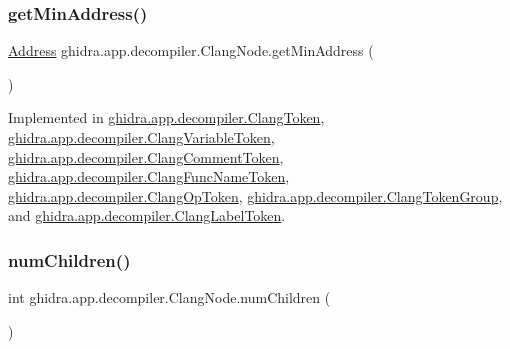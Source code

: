 \mbox{\label{interfaceghidra_1_1app_1_1decompiler_1_1_clang_node_a28f86ac40636cd77392e26367db69dc3}} 
\subsubsection{\texorpdfstring{getMinAddress()}{getMinAddress()}}
{\footnotesize\ttfamily \mbox{\hyperlink{class_address}{Address}} ghidra.\+app.\+decompiler.\+Clang\+Node.\+get\+Min\+Address (\begin{DoxyParamCaption}{ }\end{DoxyParamCaption})}



Implemented in \mbox{\hyperlink{classghidra_1_1app_1_1decompiler_1_1_clang_token_ad29a43e8aae3a2250fcb8632a4010993}{ghidra.\+app.\+decompiler.\+Clang\+Token}}, \mbox{\hyperlink{classghidra_1_1app_1_1decompiler_1_1_clang_variable_token_a655defda8c1c17f607fdddb356e51b6b}{ghidra.\+app.\+decompiler.\+Clang\+Variable\+Token}}, \mbox{\hyperlink{classghidra_1_1app_1_1decompiler_1_1_clang_comment_token_a37ada2eb4a2e4a987ae098096459910a}{ghidra.\+app.\+decompiler.\+Clang\+Comment\+Token}}, \mbox{\hyperlink{classghidra_1_1app_1_1decompiler_1_1_clang_func_name_token_a61430467edbd9abc0f53efa04608afbf}{ghidra.\+app.\+decompiler.\+Clang\+Func\+Name\+Token}}, \mbox{\hyperlink{classghidra_1_1app_1_1decompiler_1_1_clang_op_token_ac5caf9ff72e305f37b06aa5228e176e4}{ghidra.\+app.\+decompiler.\+Clang\+Op\+Token}}, \mbox{\hyperlink{classghidra_1_1app_1_1decompiler_1_1_clang_token_group_a2709c31b4d0db8b4f51d2191c33b7c2f}{ghidra.\+app.\+decompiler.\+Clang\+Token\+Group}}, and \mbox{\hyperlink{classghidra_1_1app_1_1decompiler_1_1_clang_label_token_a077f85f65075e08fbd1a566bd4ada277}{ghidra.\+app.\+decompiler.\+Clang\+Label\+Token}}.

\mbox{\label{interfaceghidra_1_1app_1_1decompiler_1_1_clang_node_a28f5c1cfc3842ee74333e5d5a5910976}} 
\subsubsection{\texorpdfstring{numChildren()}{numChildren()}}
{\footnotesize\ttfamily int ghidra.\+app.\+decompiler.\+Clang\+Node.\+num\+Children (\begin{DoxyParamCaption}{ }\end{DoxyParamCaption})}



